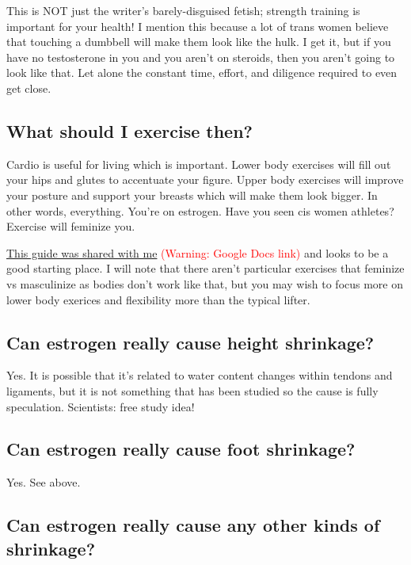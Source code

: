 \documentclass{article}
\begin{document}
This is NOT just the writer’s barely-disguised fetish; strength training is important for your health! I mention this because a lot of trans women believe that touching a dumbbell will make them look like the hulk. I get it, but if you have no testosterone in you and you aren’t on steroids, then you aren’t going to look like that. Let alone the constant time, effort, and diligence required to even get close.

\subsection{What should I exercise then?}\label{11-16}

Cardio is useful for living which is important. Lower body exercises will fill out your hips and glutes to accentuate your figure. Upper body exercises will improve your posture and support your breasts which will make them look bigger. In other words, everything. You’re on estrogen. Have you seen cis women athletes? Exercise will feminize you.

\href{https://docs.google.com/document/d/1-NyE5EY5TTaRRMhk7HlTbKJ7HifjEsA4jlDO1qKQVl0/edit?tab=t.0}{This guide was shared with me} \textcolor{red}{(Warning: Google Docs link)} and looks to be a good starting place. I will note that there aren't particular exercises that feminize vs masculinize as bodies don't work like that, but you may wish to focus more on lower body exerices and flexibility more than the typical lifter.

\subsection{Can estrogen really cause height shrinkage?}

Yes. It is possible that it’s related to water content changes within tendons and ligaments, but it is not something that has been studied so the cause is fully speculation. Scientists: free study idea!

\subsection{Can estrogen really cause foot shrinkage?}

Yes. See above.

\subsection{Can estrogen really cause any other kinds of shrinkage?}
\end{document}
